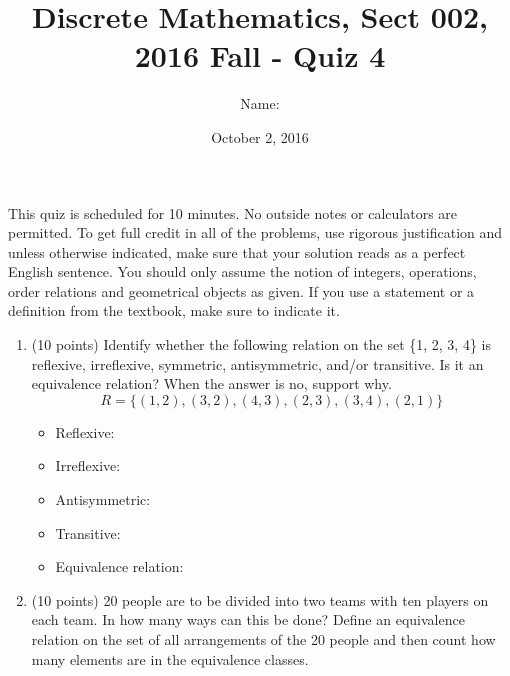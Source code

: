 \documentclass[11pt]{preprint}
\title{Discrete Mathematics, Sect 002, 2016 Fall - Quiz 4}
\author{Name:}
\institute{Courant Institute of Mathematical Sciences, NYU}
\date{October 2, 2016}
\begin{document}
\maketitle

This quiz is scheduled for 10 minutes. No outside notes or calculators are permitted. To get full credit  in all of the problems, use rigorous justification and unless otherwise indicated, make sure that your solution reads as a perfect English sentence. You should only assume the notion of integers, operations, order relations and geometrical objects as given. If you use a statement or a definition from the textbook, make sure to indicate it.
\vspace{0.2cm}

\begin{enumerate}
\item(10 points) Identify whether the following relation on the set \{1, 2, 3, 4\} is reflexive,
irreflexive, symmetric, antisymmetric, and/or transitive. Is it an equivalence relation? When the answer is no, support why.
\[
R = \{(1, 2), (3, 2), (4, 3), (2, 3), (3, 4), (2, 1)\}
\]
\begin{itemize}
\item Reflexive:
\item Irreflexive:
\item Antisymmetric:
\item Transitive:
\item Equivalence relation:
\end{itemize}
\vspace{2cm}
\item (10 points) 20 people are to be divided into two teams with ten players on each team. In how many ways can this be done? Define an equivalence relation on the set of all arrangements of the 20 people and then count how many elements are in the equivalence classes.
\end{enumerate}
\end{document}
